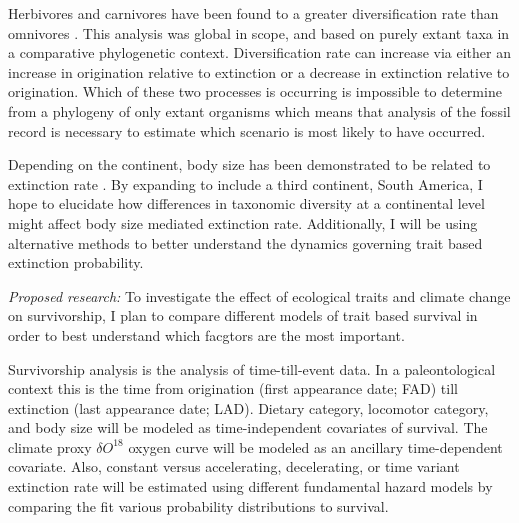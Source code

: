 \documentclass[12pt,letterpaper]{article}
\begin{document}
Herbivores and carnivores have been found to a greater diversification rate than omnivores \citep{Price2012}. This analysis was global in scope, and based on purely extant taxa in a comparative phylogenetic context. Diversification rate can increase via either an increase in origination relative to extinction or a decrease in extinction relative to origination. Which of these two processes is occurring is impossible to determine from a phylogeny of only extant organisms \citep{Rabosky2010a} which means that analysis of the fossil record is necessary to estimate which scenario is most likely to have occurred. 

Depending on the continent, body size has been demonstrated to be related to extinction rate \citep{Tomiya2013,Liow2008,Liow2009}. By expanding to include a third continent, South America, I hope to elucidate how differences in taxonomic diversity at a continental level might affect body size mediated extinction rate. Additionally, I will be using alternative methods to better understand the dynamics governing trait based extinction probability.

\textit{Proposed research:}
To investigate the effect of ecological traits and climate change on survivorship, I plan to compare different models of trait based survival in order to best understand which facgtors are the most important.

Survivorship analysis is the analysis of time-till-event data. In a paleontological context this is the time from origination (first appearance date; FAD) till extinction (last appearance date; LAD). Dietary category, locomotor category, and body size will be modeled as time-independent covariates of survival. The climate proxy \(\delta O^{18}\) oxygen curve \citep{Zachos2008} will be modeled as an ancillary time-dependent covariate. Also, constant versus accelerating, decelerating, or time variant extinction rate will be estimated using different fundamental hazard models by comparing the fit various probability distributions to survival.

\end{document}
